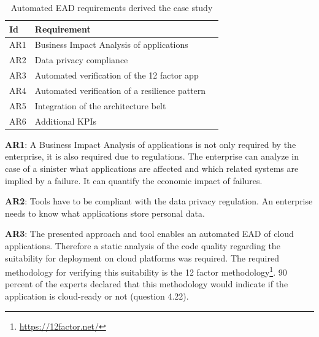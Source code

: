 \begin{table}[htpb]
  \caption[Automated EAD requirements derived from the case study]{Automated EAD requirements derived the case study}\label{tab:additionalcasestudyrequirements}
  \centering
  \begin{tabular}{l l l}
    \toprule
      Id & Requirement\\
    \midrule
      AR1 & Business Impact Analysis of applications\\
      AR2 & Data privacy compliance\\
      AR3 & Automated verification of the 12 factor app\\
      AR4 & Automated verification of a resilience pattern\\
      AR5 & Integration of the architecture belt\\
      AR6 & Additional KPIs\\
    \bottomrule
  \end{tabular}
\end{table}

\textbf{AR1}: A Business Impact Analysis of applications is not only required by the enterprise, it is also required due to regulations. The enterprise can analyze in case of a sinister what applications are affected and which related systems are implied by a failure. It can quantify the economic impact of failures.

\textbf{AR2}: Tools have to be compliant with the data privacy regulation. An enterprise needs to know what applications store personal data. 

\textbf{AR3}: The presented approach and tool enables an automated EAD of cloud applications. Therefore a static analysis of the code quality regarding the suitability for deployment on cloud platforms was required. The required methodology for verifying this suitability is the 12 factor methodology\footnote{\url{https://12factor.net/}}. 90 percent of the experts declared that this methodology would indicate if the application is cloud-ready or not (question 4.22).

